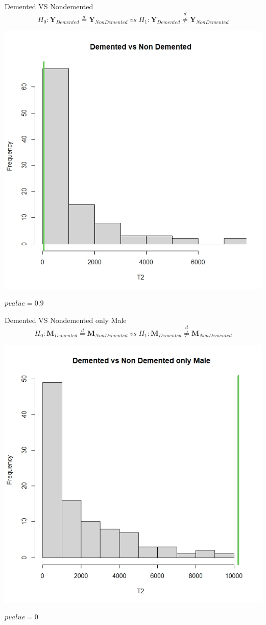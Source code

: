 \documentclass{beamer}
\begin{document}
	\begin{frame}{Demented VS Nondemented }
	\vspace{-0.3cm}
		$$
	H_0: \mathbf{Y}_{Demented} \overset{d}{=} \mathbf{Y}_{Non Demented}\;vs\;H_1:\mathbf{Y}_{Demented} \overset{d}{\neq} \mathbf{Y}_{Non Demented}
	$$
	
 	\begin{center}
 		\includegraphics[width=0.5\columnwidth]{histdemvsnondem.jpeg}
 	\end{center}
 	\vspace{-0.7cm}
 	$pvalue= 0.9 $
	\end{frame}
	
	\begin{frame}{Demented VS Nondemented only Male}
	\vspace{-0.3cm}
	$$
	H_0: \mathbf{M}_{Demented} \overset{d}{=} \mathbf{M}_{Non Demented}\;vs\;H_1:\mathbf{M}_{Demented} \overset{d}{\neq} \mathbf{M}_{Non Demented}
	$$
	\begin{center}
		\includegraphics[width=0.5\columnwidth]{histdvsnmale.jpeg}
	\end{center}
	\vspace{-0.7cm}
	$pvalue= 0 $
	\end{frame}
	
\end{document}
